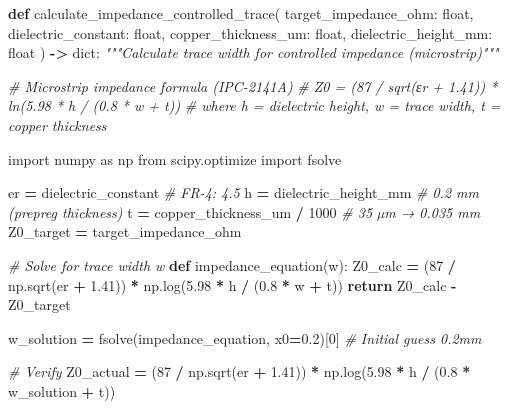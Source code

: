 \documentclass[
]{article}
\newenvironment{Shaded}{\begin{snugshade}}{\end{snugshade}}
\newcommand{\BuiltInTok}[1]{#1}
\newcommand{\CommentTok}[1]{\textcolor[rgb]{0.56,0.35,0.01}{\textit{#1}}}
\newcommand{\ControlFlowTok}[1]{\textcolor[rgb]{0.13,0.29,0.53}{\textbf{#1}}}
\newcommand{\DecValTok}[1]{\textcolor[rgb]{0.00,0.00,0.81}{#1}}
\newcommand{\FloatTok}[1]{\textcolor[rgb]{0.00,0.00,0.81}{#1}}
\newcommand{\ImportTok}[1]{#1}
\newcommand{\KeywordTok}[1]{\textcolor[rgb]{0.13,0.29,0.53}{\textbf{#1}}}
\newcommand{\NormalTok}[1]{#1}
\newcommand{\OperatorTok}[1]{\textcolor[rgb]{0.81,0.36,0.00}{\textbf{#1}}}
\begin{document}
\begin{Shaded}
\begin{Highlighting}[]
\KeywordTok{def}\NormalTok{ calculate\_impedance\_controlled\_trace(}
\NormalTok{    target\_impedance\_ohm: }\BuiltInTok{float}\NormalTok{,}
\NormalTok{    dielectric\_constant: }\BuiltInTok{float}\NormalTok{,}
\NormalTok{    copper\_thickness\_um: }\BuiltInTok{float}\NormalTok{,}
\NormalTok{    dielectric\_height\_mm: }\BuiltInTok{float}
\NormalTok{) }\OperatorTok{{-}\textgreater{}} \BuiltInTok{dict}\NormalTok{:}
    \CommentTok{"""Calculate trace width for controlled impedance (microstrip)"""}

    \CommentTok{\# Microstrip impedance formula (IPC{-}2141A)}
    \CommentTok{\# Z0 = (87 / sqrt(εr + 1.41)) * ln(5.98 * h / (0.8 * w + t))}
    \CommentTok{\# where h = dielectric height, w = trace width, t = copper thickness}

    \ImportTok{import}\NormalTok{ numpy }\ImportTok{as}\NormalTok{ np}
    \ImportTok{from}\NormalTok{ scipy.optimize }\ImportTok{import}\NormalTok{ fsolve}

\NormalTok{    er }\OperatorTok{=}\NormalTok{ dielectric\_constant  }\CommentTok{\# FR{-}4: 4.5}
\NormalTok{    h }\OperatorTok{=}\NormalTok{ dielectric\_height\_mm  }\CommentTok{\# 0.2 mm (prepreg thickness)}
\NormalTok{    t }\OperatorTok{=}\NormalTok{ copper\_thickness\_um }\OperatorTok{/} \DecValTok{1000}  \CommentTok{\# 35 µm → 0.035 mm}
\NormalTok{    Z0\_target }\OperatorTok{=}\NormalTok{ target\_impedance\_ohm}

    \CommentTok{\# Solve for trace width w}
    \KeywordTok{def}\NormalTok{ impedance\_equation(w):}
\NormalTok{        Z0\_calc }\OperatorTok{=}\NormalTok{ (}\DecValTok{87} \OperatorTok{/}\NormalTok{ np.sqrt(er }\OperatorTok{+} \FloatTok{1.41}\NormalTok{)) }\OperatorTok{*}\NormalTok{ np.log(}\FloatTok{5.98} \OperatorTok{*}\NormalTok{ h }\OperatorTok{/}\NormalTok{ (}\FloatTok{0.8} \OperatorTok{*}\NormalTok{ w }\OperatorTok{+}\NormalTok{ t))}
        \ControlFlowTok{return}\NormalTok{ Z0\_calc }\OperatorTok{{-}}\NormalTok{ Z0\_target}

\NormalTok{    w\_solution }\OperatorTok{=}\NormalTok{ fsolve(impedance\_equation, x0}\OperatorTok{=}\FloatTok{0.2}\NormalTok{)[}\DecValTok{0}\NormalTok{]  }\CommentTok{\# Initial guess 0.2mm}

    \CommentTok{\# Verify}
\NormalTok{    Z0\_actual }\OperatorTok{=}\NormalTok{ (}\DecValTok{87} \OperatorTok{/}\NormalTok{ np.sqrt(er }\OperatorTok{+} \FloatTok{1.41}\NormalTok{)) }\OperatorTok{*}\NormalTok{ np.log(}\FloatTok{5.98} \OperatorTok{*}\NormalTok{ h }\OperatorTok{/}\NormalTok{ (}\FloatTok{0.8} \OperatorTok{*}\NormalTok{ w\_solution }\OperatorTok{+}\NormalTok{ t))}


\end{Highlighting}
\end{Shaded}
\end{document}
